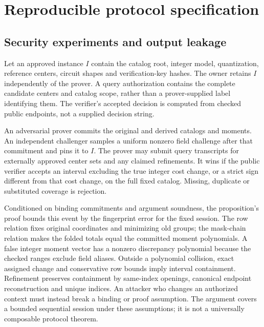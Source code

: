 \section{Reproducible protocol specification}\label{sec:protocol-spec}
\subsection{Security experiments and output leakage}\label{sec:security-experiments}
Let an approved instance $I$ contain the catalog root, integer model,
quantization, reference centers, circuit shapes and verification-key hashes.
The owner retains $I$ independently of the prover. A query authorization
contains the complete candidate centers and catalog scope, rather than a
prover-supplied label identifying them. The verifier's accepted decision is
computed from checked public endpoints, not a supplied decision string.

\begin{definition}
An adversarial prover commits the original and derived catalogs and moments.
An independent challenger samples a uniform nonzero field challenge after
that commitment and pins it to $I$. The prover may submit query transcripts
for externally approved center sets and any claimed refinements. It wins if
the public verifier accepts an interval excluding the true integer cost
change, or a strict sign different from that cost change, on the full fixed
catalog. Missing, duplicate or substituted coverage is rejection.
\end{definition}
Conditioned on binding commitments and argument soundness, the proposition's
proof bounds this event by the fingerprint error for the fixed session.
The row relation fixes original coordinates and minimizing old groups; the
mask-chain relation makes the folded totals equal the committed moment
polynomials. A false integer moment vector has a nonzero discrepancy
polynomial because the checked ranges exclude field aliases. Outside a
polynomial collision, exact assigned change and conservative row bounds
imply interval containment. Refinement preserves containment by same-index
openings, canonical endpoint reconstruction and unique indices. An attacker
who changes an authorized context must instead break a binding or proof
assumption. The argument covers a bounded sequential session under these
assumptions; it is not a universally composable protocol theorem.


